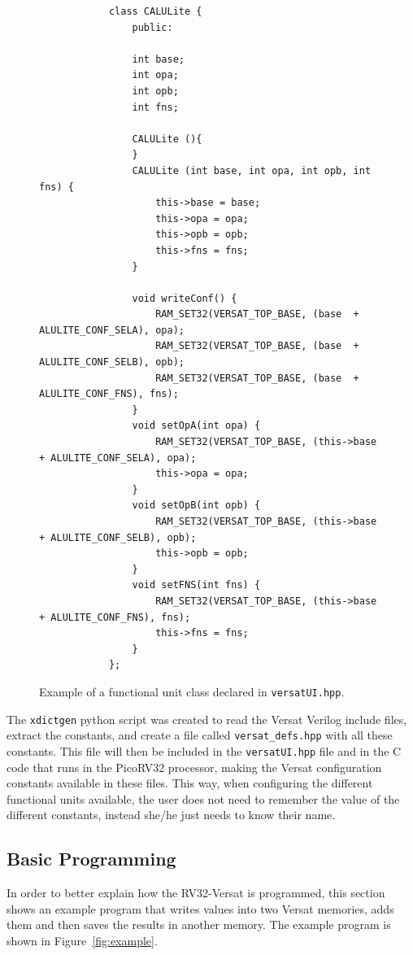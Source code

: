 \begin{figure}[!htb]
	\begin{minipage}{\linewidth}
		\begin{spacing}{0.7}
			\begin{lstlisting}
			class CALULite {
				public:
				
				int base;
				int opa;
				int opb;
				int fns;
				
				CALULite (){
				}
				CALULite (int base, int opa, int opb, int fns) {
					this->base = base;
					this->opa = opa;
					this->opb = opb;
					this->fns = fns;
				}
				
				void writeConf() {
					RAM_SET32(VERSAT_TOP_BASE, (base  + ALULITE_CONF_SELA), opa);
					RAM_SET32(VERSAT_TOP_BASE, (base  + ALULITE_CONF_SELB), opb);
					RAM_SET32(VERSAT_TOP_BASE, (base  + ALULITE_CONF_FNS), fns);
				}
				void setOpA(int opa) {
					RAM_SET32(VERSAT_TOP_BASE, (this->base  + ALULITE_CONF_SELA), opa);
					this->opa = opa; 
				}
				void setOpB(int opb) {
					RAM_SET32(VERSAT_TOP_BASE, (this->base  + ALULITE_CONF_SELB), opb);
					this->opb = opb; 
				}
				void setFNS(int fns) {
					RAM_SET32(VERSAT_TOP_BASE, (this->base  + ALULITE_CONF_FNS), fns);
					this->fns = fns; 
				}
			};
			\end{lstlisting}
		\end{spacing}
	\end{minipage}
	\vspace*{-10mm}
	\caption{Example of a functional unit class declared in {\tt versatUI.hpp}.}
	\label{fig:versatUI}
\end{figure}

The {\tt xdictgen} python script was created to read the Versat Verilog include
files, extract the constants, and create a file called {\tt versat\_defs.hpp} with
all these constants. This file will then be included in the {\tt versatUI.hpp} file and
in the C code that runs in the PicoRV32 processor, making the Versat
configuration constants available in these files. This way, when configuring the
different functional units available, the user does not need to remember the
value of the different constants, instead she/he just needs to know their name.


\subsection{Basic Programming}
\label{subsection:bprogramming}

In order to better explain how the RV32-Versat is programmed, this section shows
an example program that writes values into two Versat memories, adds them and
then saves the results in another memory. The example program is shown in
Figure~\ref{fig:example}.

